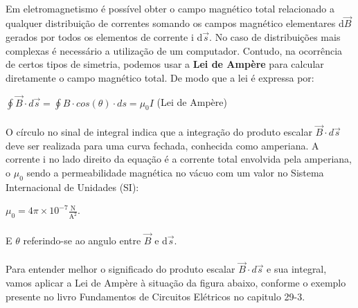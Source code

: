 \documentclass[a4paper, 12pt]{article}
\begin{document}
\paragraph{} Em eletromagnetismo é possível obter o campo magnético total relacionado a qualquer distribuição de correntes somando os campos magnético elementares d$\overrightarrow{B}$ gerados por todos os elementos de corrente i d$\overrightarrow{s}$. No caso de distribuições mais complexas é necessário a utilização de um computador. Contudo, na ocorrência de certos tipos de simetria, podemos usar a \textbf{Lei de Ampère} para calcular diretamente o campo magnético total. De modo que a lei é expressa por:
\begin{mdframed}[backgroundcolor=gray!20]
\begin{center}
		\quad $\oint{\overrightarrow{B}}\cdot d\overrightarrow{s}= \oint{B}\cdot cos(\theta) \cdot ds =\mu _{0}I$  (Lei de Ampère)
		\end{center}
\end{mdframed}
    
   	
\paragraph{}O círculo no sinal de integral indica que a integração do produto escalar $\overrightarrow{B}\cdot d\overrightarrow{s}$ deve ser realizada para uma curva fechada, conhecida como amperiana. A corrente i no lado direito da equação é a corrente total envolvida pela amperiana, o $\mu _{0}$ sendo a permeabilidade magnética no vácuo com um valor no Sistema Internacional de Unidades (SI):
\\
\begin{mdframed}[backgroundcolor=gray!20]
\begin{center}
    ${\displaystyle \mu _{0}=4\pi \times 10^{-7}{\frac {\text{N}}{{\text{A}}^{2}}}}$.
    \end{center}
\end{mdframed}
 
	\paragraph{}E $\theta$ referindo-se ao angulo entre $\overrightarrow{B}$ e d$\overrightarrow{s}$.
   
\paragraph{}Para entender melhor o significado do produto escalar $\overrightarrow{B}\cdot d\overrightarrow{s}$ e sua integral, vamos aplicar a Lei de Ampère à situação da figura abaixo, conforme o exemplo presente no livro Fundamentos de Circuitos Elétricos no capitulo 29-3. \\
\end{document}
